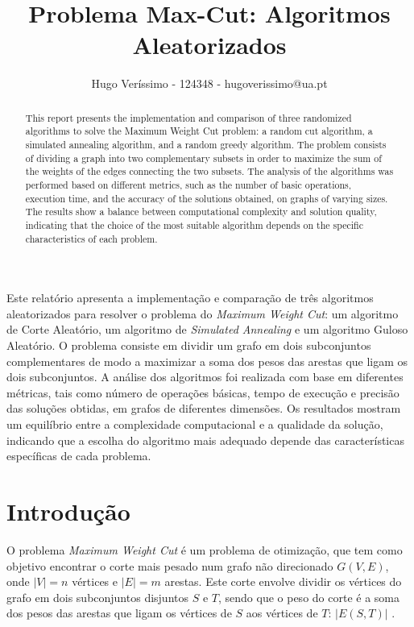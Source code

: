 \documentclass[mirror, portugues]{revdetua}
\begin{document}

\title{Problema Max-Cut: Algoritmos Aleatorizados}
\author{Hugo Veríssimo - 124348 - hugoverissimo@ua.pt}
\maketitle

\begin{abstract}
This report presents the implementation and comparison of three randomized algorithms to solve the Maximum Weight Cut problem: a random cut algorithm, a simulated annealing algorithm, and a random greedy algorithm. The problem consists of dividing a graph into two complementary subsets in order to maximize the sum of the weights of the edges connecting the two subsets. The analysis of the algorithms was performed based on different metrics, such as the number of basic operations, execution time, and the accuracy of the solutions obtained, on graphs of varying sizes. The results show a balance between computational complexity and solution quality, indicating that the choice of the most suitable algorithm depends on the specific characteristics of each problem.
\end{abstract}

\begin{resumo}
Este relatório apresenta a implementação e comparação de três algoritmos aleatorizados para resolver o problema do \textit{Maximum Weight Cut}: um algoritmo de Corte Aleatório, um algoritmo de \textit{Simulated Annealing} e um algoritmo Guloso Aleatório. O problema consiste em dividir um grafo em dois subconjuntos complementares de modo a maximizar a soma dos pesos das arestas que ligam os dois subconjuntos. A análise dos algoritmos foi realizada com base em diferentes métricas, tais como número de operações básicas, tempo de execução e precisão das soluções obtidas, em grafos de diferentes dimensões. Os resultados mostram um equilíbrio entre a complexidade computacional e a qualidade da solução, indicando que a escolha do algoritmo mais adequado depende das características específicas de cada problema.
\end{resumo}


\section{Introdução}

O problema \textit{Maximum Weight Cut} é um problema de otimização, que tem como objetivo encontrar o corte mais pesado num grafo não direcionado $G(V,E)$, onde $|V| = n$ vértices e $|E| = m$ arestas. Este corte envolve dividir os vértices do grafo em dois subconjuntos disjuntos $S$ e $T$, sendo que o peso do corte é a soma dos pesos das arestas que ligam os vértices de $S$ aos vértices de $T$: $|E(S, T)|$ \cite{AG14}.
\end{document}

